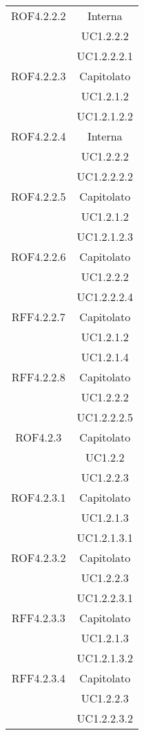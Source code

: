 \begin{longtable}{|c|c|}
\midrule
ROF4.2.2.2
& Interna\\
& UC1.2.2.2\\
& UC1.2.2.2.1\\

\midrule
ROF4.2.2.3
& Capitolato\\
& UC1.2.1.2\\
& UC1.2.1.2.2\\

\midrule
ROF4.2.2.4
& Interna\\
& UC1.2.2.2\\
& UC1.2.2.2.2\\

\midrule
ROF4.2.2.5
& Capitolato\\
& UC1.2.1.2\\
& UC1.2.1.2.3\\

\midrule
ROF4.2.2.6
& Capitolato\\
& UC1.2.2.2\\
& UC1.2.2.2.4\\

\midrule
RFF4.2.2.7
& Capitolato\\
& UC1.2.1.2\\
& UC1.2.1.4\\

\midrule
RFF4.2.2.8
& Capitolato\\
& UC1.2.2.2\\
& UC1.2.2.2.5\\

\midrule
ROF4.2.3
& Capitolato\\
& UC1.2.2\\
& UC1.2.2.3\\

\midrule
ROF4.2.3.1
& Capitolato\\
& UC1.2.1.3\\
& UC1.2.1.3.1\\

\midrule
ROF4.2.3.2
& Capitolato\\
& UC1.2.2.3\\
& UC1.2.2.3.1\\

\midrule
RFF4.2.3.3
& Capitolato\\
& UC1.2.1.3\\
& UC1.2.1.3.2\\

\midrule
RFF4.2.3.4
& Capitolato\\
& UC1.2.2.3\\
& UC1.2.2.3.2\\


\end{longtable}
